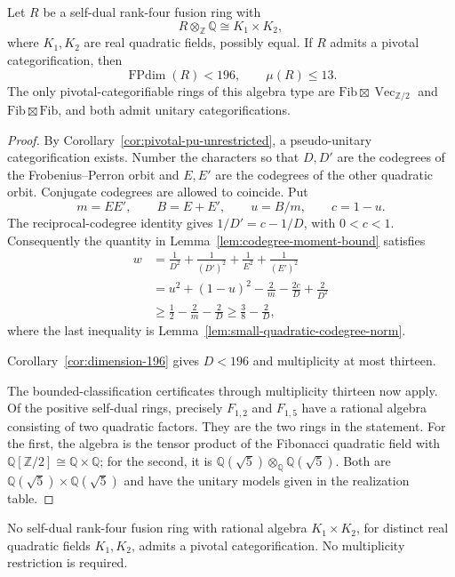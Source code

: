 \begin{theorem}\label{thm:quadratic-product-bound}
Let $R$ be a self-dual rank-four fusion ring with
\[
 R\otimes_{\mathbb Z}\mathbb Q\cong K_1\times K_2,
\]
where $K_1,K_2$ are real quadratic fields, possibly equal. If $R$
admits a pivotal categorification, then
\[
 \operatorname{FPdim}(R)<196,\qquad \mu(R)\leq13.
\]
The only pivotal-categorifiable rings of this algebra type are
$\mathrm{Fib}\boxtimes\operatorname{Vec}_{\mathbb Z/2}$ and
$\mathrm{Fib}\boxtimes\mathrm{Fib}$, and both admit unitary
categorifications.
\end{theorem}
\begin{proof}
By Corollary~\ref{cor:pivotal-pu-unrestricted}, a pseudo-unitary
categorification exists. Number the characters so that $D,D'$ are
the codegrees of the Frobenius--Perron orbit and $E,E'$ are the
codegrees of the other quadratic orbit. Conjugate codegrees are
allowed to coincide. Put
\[
 m=EE',\qquad B=E+E',\qquad u=B/m,\qquad c=1-u.
\]
The reciprocal-codegree identity gives $1/D'=c-1/D$, with $0<c<1$.
Consequently the quantity in Lemma~\ref{lem:codegree-moment-bound}
satisfies
\begin{align*}
 w&=\frac1{D^2}+\frac1{(D')^2}+\frac1{E^2}+\frac1{(E')^2}\\
  &=u^2+(1-u)^2-\frac2m-\frac{2c}{D}+\frac2{D^2}\\
  &\geq\frac12-\frac2m-\frac2D
   \geq\frac38-\frac2D,
\end{align*}
where the last inequality is
Lemma~\ref{lem:small-quadratic-codegree-norm}.

Corollary~\ref{cor:dimension-196} gives $D<196$ and multiplicity at most thirteen.

The bounded-classification certificates through multiplicity
thirteen now apply. Of the positive self-dual rings, precisely
$F_{1,2}$ and $F_{1,5}$ have a rational algebra consisting of two
quadratic factors. They are the two rings in the statement. For the
first, the algebra is the tensor product of the Fibonacci quadratic
field with $\mathbb Q[\mathbb Z/2]\cong\mathbb Q\times\mathbb Q$;
for the second, it is
$\mathbb Q(\sqrt5)\otimes_{\mathbb Q}\mathbb Q(\sqrt5)$.
Both are $\mathbb Q(\sqrt5)\times\mathbb Q(\sqrt5)$ and have the
unitary models given in the realization table.
\end{proof}

\begin{corollary}\label{cor:distinct-quadratics-excluded}
No self-dual rank-four fusion ring with rational algebra
$K_1\times K_2$, for distinct real quadratic fields $K_1,K_2$,
admits a pivotal categorification. No multiplicity restriction is
required.
\end{corollary}
